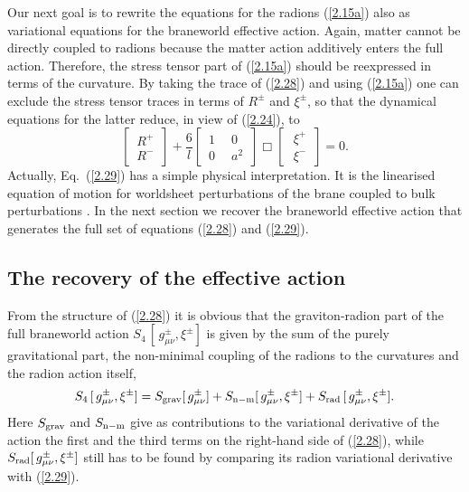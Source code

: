 \documentclass[a4paper,preprint,nofootinbib,
                 showpacs,preprintnumbers,amsmath,amssymb]{revtex4}
\begin{document}
Our next goal is to rewrite the equations for the radions 
(\ref{2.15a}) also as variational equations for the braneworld 
effective action. Again, matter cannot be directly coupled to 
radions because the matter action 
additively enters the full action. Therefore, the stress tensor 
part of (\ref{2.15a}) should be reexpressed in terms of the 
curvature. By taking the trace of 
(\ref{2.28}) and using (\ref{2.15a}) one can exclude the stress 
tensor traces in terms of $R^\pm$ and 
$\xi^\pm$, so that the dynamical equations for the latter 
reduce, in view of (\ref{2.24}), to 
    \begin{equation} 
    \left[\begin{array}{c} 
      \,R^+\, \\ 
      \, R^-\, 
    \end{array}\right]+\frac6l\left[\begin{array}{cc} 
      \,1\,\,&\,0\, \\ 
      \, 0\,\,&\,a^2 \, 
    \end{array}\right]\Box \left[\begin{array}{c} 
      \,\,\xi^+\, \\ 
      \,\, \xi^-\, 
    \end{array}\right]=0.                           \label{2.29} 
    \end{equation} 
Actually, Eq.~(\ref{2.29}) has a simple physical interpretation. It is the 
linearised equation of motion for worldsheet perturbations of the brane 
coupled to bulk perturbations \cite{worldsheet}. 
In the next section we recover the braneworld effective action 
that generates the full set of equations (\ref{2.28}) and 
(\ref{2.29}). 
 
 
\subsection{The recovery of the effective action 
\label{action}} 
 From the structure of (\ref{2.28}) it is obvious that the  
graviton-radion part of the full braneworld action  
$ S_4\,[\,g^\pm_{\mu\nu},\xi^\pm]$ is given 
by the sum of the purely gravitational part, the non-minimal 
coupling of the radions to the curvatures and the radion action itself, 
    \begin{equation} 
    S_4\,[\,g^\pm_{\mu\nu},\xi^\pm] 
    =S_{\rm grav}[\,g^\pm_{\mu\nu}]+ 
    S_{\rm n-m}[\,g^\pm_{\mu\nu},\xi^\pm]+ 
    S_{\rm rad}\,[\,g^\pm_{\mu\nu},\xi^\pm]. 
    \end{equation} 
Here $S_{\rm grav}$ and $S_{\rm n-m}$ give as contributions to 
the variational derivative of the action the first and the third 
terms on the right-hand side of (\ref{2.28}), while 
$S_{\rm rad}[\,g^\pm_{\mu\nu},\xi^\pm]$ still has to be 
found by comparing its radion variational derivative with 
(\ref{2.29}). 
 
\end{document}
